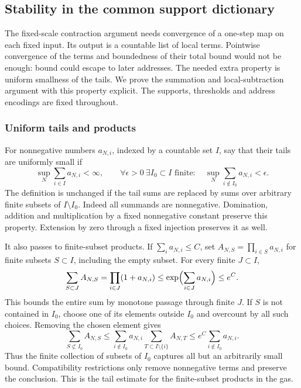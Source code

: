 \subsection{Stability in the common support dictionary}
\label{sec:local-source-stability}
The fixed-scale contraction argument needs convergence of a one-step
map on each fixed input. Its output is a countable list of local
terms. Pointwise convergence of the terms and boundedness of their
total bound would not be enough: bound could escape to later addresses.
The needed extra property is uniform smallness of the tails. We prove
the summation and local-subtraction argument with this property explicit.
The supports, thresholds and address encodings are fixed throughout.

\subsubsection{Uniform tails and products}
For nonnegative numbers $a_{N,i}$, indexed by a countable set $I$,
say that their tails are uniformly small if
\[
 \sup_N\sum_{i\in I}a_{N,i}<\infty,
 \qquad
 \forall\epsilon>0\ \exists I_0\subset I\text{ finite}:\quad
 \sup_N\sum_{i\notin I_0}a_{N,i}<\epsilon.
\]
The definition is unchanged if the tail sums are replaced by sums
over arbitrary finite subsets of $I\setminus I_0$. Indeed all
summands are nonnegative. Domination, addition and multiplication
by a fixed nonnegative constant preserve this property. Extension
by zero through a fixed injection preserves it as well.

It also passes to finite-subset products. If
$\sum_i a_{N,i}\le C$, set $A_{N,S}=\prod_{i\in S}a_{N,i}$
for finite subsets $S\subset I$, including the empty subset.
For every finite $J\subset I$,
\[
 \sum_{S\subset J}A_{N,S}
       =\prod_{i\in J}(1+a_{N,i})
       \le\exp\Bigl(\sum_{i\in J}a_{N,i}\Bigr)\le e^C.
\]
This bounds the entire sum by monotone passage through finite $J$.
If $S$ is not contained in $I_0$, choose one of its elements outside
$I_0$ and overcount by all such choices. Removing the chosen element
gives
\[
 \sum_{S\not\subset I_0}A_{N,S}
 \le\sum_{i\notin I_0}a_{N,i}
                   \sum_{T\subset I\setminus\{i\}}A_{N,T}
 \le e^C\sum_{i\notin I_0}a_{N,i}.
\]
Thus the finite collection of subsets of $I_0$ captures all but
an arbitrarily small bound. Compatibility restrictions only
remove nonnegative terms and preserve the conclusion. This is
the tail estimate for the finite-subset products in the gas.


